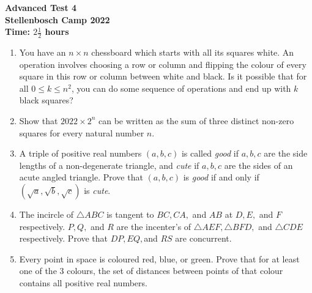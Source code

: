 \documentclass{article}
\begin{document}
\thispagestyle{empty}

\begin{center}
  \textbf{\Large Advanced Test 4}
  \\ \vspace{1em}
  \textbf{\large Stellenbosch Camp 2022}
  \\ \vspace{1em}
  \textbf{\large Time: $2\frac{1}{2}$ hours}
\end{center}

\bigskip

\begin{enumerate}[itemsep=\fill]

\item %
You have an $n\times n$ chessboard which starts with all its squares white. An operation involves choosing a row or column and flipping the colour of every square in this row or column between white and black. Is it possible that for all $0\leq k\leq n^2$, you can do some sequence of operations and end up with $k$ black squares?


\item %
Show that $2022 \times 2^n$ can be written as the sum of three distinct non-zero squares for every natural number $n$.


\item %
A triple of positive real numbers $(a,b,c)$ is called \textit{good} if $a,b,c$ are the side lengths of a non-degenerate triangle, and \textit{cute} if $a,b,c$ are the sides of an acute angled triangle. Prove that $(a,b,c)$ is \textit{good} if and only if $(\sqrt{a},\sqrt{b},\sqrt{c})$ is \textit{cute}. 


\item %
The incircle of $\triangle ABC$ is tangent to $BC,CA,$ and $AB$ at $D,E,$ and $F$ respectively. $P,Q,$ and $R$ are the incenter's of $\triangle AEF, \triangle BFD,$ and $\triangle CDE$ respectively. Prove that $DP, EQ, $and $RS$ are concurrent.


\item %
Every point in space is coloured red, blue, or green. Prove that for at least one of the 3 colours, the set of distances between points of that colour contains all positive real numbers.


\end{enumerate}
\end{document}
